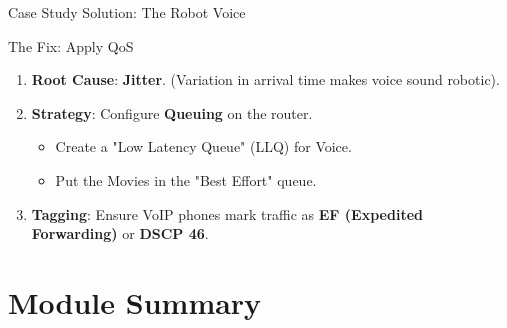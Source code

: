 \documentclass[aspectratio=169]{beamer}  %
\begin{document}
\begin{frame}{Case Study Solution: The Robot Voice}
    \begin{exampleblock}{The Fix: Apply QoS}
        \footnotesize
        \begin{enumerate}
            \item \textbf{Root Cause}: \textbf{Jitter}. (Variation in arrival time makes voice sound robotic).
            \item \textbf{Strategy}: Configure \textbf{Queuing} on the router.
            \begin{itemize} \scriptsize
                \item Create a "Low Latency Queue" (LLQ) for Voice.
                \item Put the Movies in the "Best Effort" queue.
            \end{itemize}
            \item \textbf{Tagging}: Ensure VoIP phones mark traffic as \textbf{EF (Expedited Forwarding)} or \textbf{DSCP 46}.
        \end{enumerate}
    \end{exampleblock}
    \begin{center}
    \end{center}
\end{frame}

\section*{Module Summary}
\end{document}
